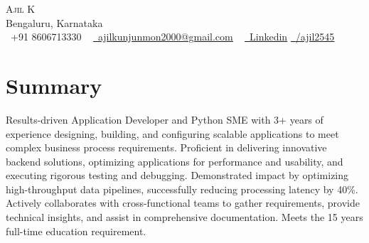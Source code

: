\documentclass[letterpaper,11pt]{article}
\newcommand{\resumeSubHeadingListStart}{\begin{itemize}[leftmargin=0.0in, label={}]}
\newcommand{\resumeSubHeadingListEnd}{\end{itemize}}
\begin{document}


\begin{center}
    {\Huge \scshape Ajil K} \\ \vspace{1pt}
    Bengaluru, Karnataka \\ \vspace{1pt}
    \small \raisebox{-0.1\height}\faPhone\ +91 8606713330 ~ \href{mailto:ajilkunjunmon2000@gmail.com}{\raisebox{-0.2\height}\faEnvelope\  \underline{ajilkunjunmon2000@gmail.com}} ~ 
    \href{https://www.linkedin.com/in/ajil-k/}{\raisebox{-0.2\height}\faLinkedin\ \underline{Linkedin}} 
    \href{https://github.com/ajil2545}{\raisebox{-0.2\height}\faGithub\ 
    \underline{/ajil2545}}
    \vspace{-8pt}
\end{center}

\section{Summary}
  \small{
    Results-driven Application Developer and Python SME with 3+ years of experience designing, building, and configuring scalable applications to meet complex business process requirements. Proficient in delivering innovative backend solutions, optimizing applications for performance and usability, and executing rigorous testing and debugging. Demonstrated impact by optimizing high-throughput data pipelines, successfully reducing processing latency by 40\%. Actively collaborates with cross-functional teams to gather requirements, provide technical insights, and assist in comprehensive documentation. Meets the 15 years full-time education requirement.}
  
\end{document}
